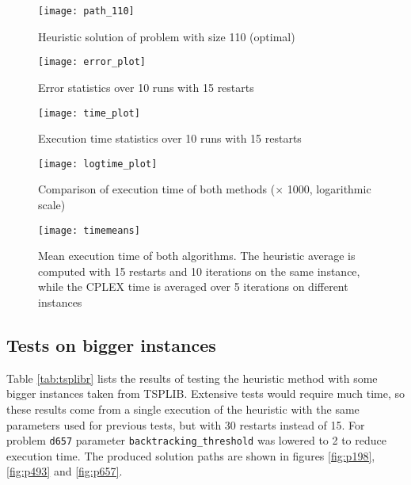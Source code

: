 

\begin{figure}[H]
	\centering
	\texttt{[image: path\_110]}
	\caption{Heuristic solution of problem with size 110 (optimal)}
	\label{fig:path110}
\end{figure}

\begin{figure}[H]
	\centering
	\texttt{[image: error\_plot]}
	\caption{Error statistics over 10 runs with 15 restarts}
	\label{fig:ploterr}
\end{figure}

\begin{figure}[H]
	\centering
	\texttt{[image: time\_plot]}
	\caption{Execution time statistics over 10 runs with 15 restarts}
	\label{fig:plotime}
\end{figure}

\begin{figure}[H]
	\centering
	\texttt{[image: logtime\_plot]}
	\caption{Comparison of execution time of both methods ($\times$ 1000, logarithmic scale)}
	\label{fig:logtime}
\end{figure}

\begin{figure}[H]
	\centering
	\texttt{[image: timemeans]}
	\caption[Mean execution time of both methods]{Mean execution time of both algorithms. The heuristic average is computed with 15 restarts and 10 iterations on the same instance, while the CPLEX time is averaged over 5 iterations on different instances}
	\label{fig:timelinear}
\end{figure}

\subsection{Tests on bigger instances}
Table \ref{tab:tsplibr} lists the results of testing the heuristic method with some bigger instances taken from TSPLIB. Extensive tests would require much time, so these results come from a single execution of the heuristic with the same parameters used for previous tests, but with 30 restarts instead of 15. For problem \texttt{d657} parameter \texttt{backtracking\_threshold} was lowered to 2 to reduce execution time. The produced solution paths are shown in figures \ref{fig:p198}, \ref{fig:p493} and \ref{fig:p657}.

